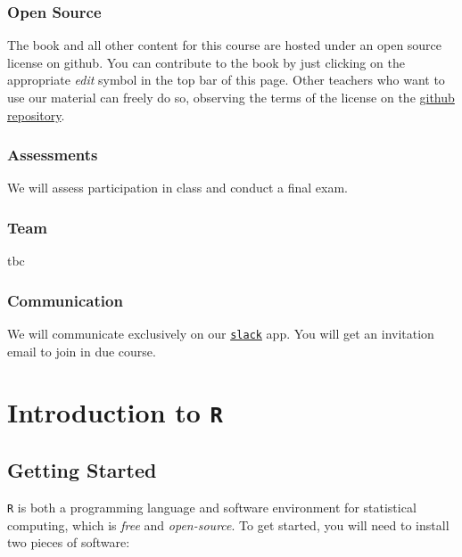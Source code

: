 \documentclass[]{book}
\theoremstyle{definition}
\theoremstyle{definition}
\theoremstyle{definition}
\theoremstyle{remark}
\begin{document}
\subsection*{Open Source}\label{open-source}

The book and all other content for this course are hosted under an open
source license on github. You can contribute to the book by just
clicking on the appropriate \emph{edit} symbol in the top bar of this
page. Other teachers who want to use our material can freely do so,
observing the terms of the license on the
\href{https://github.com/ScPoEcon/ScPoEconometrics}{github repository}.

\subsection*{Assessments}\label{assessments}

We will assess participation in class and conduct a final exam.

\subsection*{Team}\label{team}

tbc

\subsection*{Communication}\label{communication}

We will communicate exclusively on our
\href{https://econometrics-scpo.slack.com}{\texttt{slack}} app. You will
get an invitation email to join in due course.

\chapter{\texorpdfstring{Introduction to
\texttt{R}}{Introduction to R}}\label{R-intro}

\section{Getting Started}\label{getting-started}

\texttt{R} is both a programming language and software environment for
statistical computing, which is \emph{free} and \emph{open-source}. To
get started, you will need to install two pieces of software:
\end{document}

